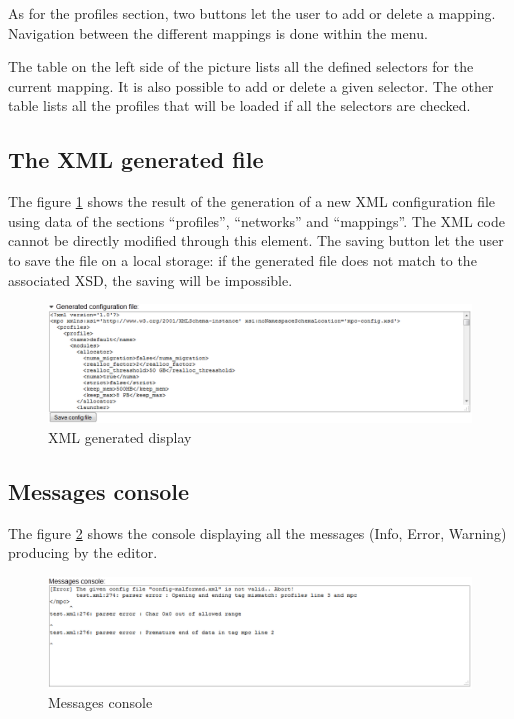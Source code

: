 \documentclass{article}
\begin{document}
\noindent As for the profiles section, two buttons let the user to add or delete a mapping. Navigation between the different mappings is done within the menu.
\newline

\noindent The table on the left side of the picture lists all the defined selectors for the current mapping. It is also possible to add or delete a given selector. The other table lists all the profiles that will be loaded if all the selectors are checked.

\subsection{The XML generated file}

The figure \ref{fig:generated_editor} shows the result of the generation of a new XML configuration file using data of the sections ``profiles'', ``networks'' and ``mappings''. The XML code cannot be directly modified through this element. The saving button let the user to save the file on a local storage: if the generated file does not match to the associated XSD, the saving will be impossible.

\begin{figure}[!h]
\includegraphics[width=\textwidth]{./pictures/generated_editor.png}
\caption{XML generated display}
\label{fig:generated_editor}
\end{figure}

\subsection{Messages console}

The figure \ref{fig:messages_editor} shows the console displaying all the messages (Info, Error, Warning) producing by the editor.

\begin{figure}[!h]
\includegraphics[width=\textwidth]{./pictures/messages_editor.png}
\caption{Messages console}
\label{fig:messages_editor}
\end{figure}
\end{document}
